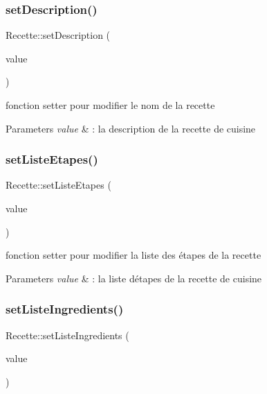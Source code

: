 \subsubsection{\texorpdfstring{set\+Description()}{setDescription()}}
{\footnotesize\ttfamily Recette\+::set\+Description (\begin{DoxyParamCaption}\item[{const Q\+String \&}]{value }\end{DoxyParamCaption})}



fonction setter pour modifier le nom de la recette 


\begin{DoxyParams}{Parameters}
{\em value} & \+: la description de la recette de cuisine \\
\hline
\end{DoxyParams}
\mbox{\label{classRecette_aaf908c155a9b4936b94ca7852232f57d}} 
\subsubsection{\texorpdfstring{set\+Liste\+Etapes()}{setListeEtapes()}}
{\footnotesize\ttfamily Recette\+::set\+Liste\+Etapes (\begin{DoxyParamCaption}\item[{const Q\+String\+List \&}]{value }\end{DoxyParamCaption})}



fonction setter pour modifier la liste des étapes de la recette 


\begin{DoxyParams}{Parameters}
{\em value} & \+: la liste d\textquotesingle{}étapes de la recette de cuisine \\
\hline
\end{DoxyParams}
\mbox{\label{classRecette_a5d50321b71741def086d7897e2dd62f7}} 
\subsubsection{\texorpdfstring{set\+Liste\+Ingredients()}{setListeIngredients()}}
{\footnotesize\ttfamily Recette\+::set\+Liste\+Ingredients (\begin{DoxyParamCaption}\item[{const Q\+String\+List \&}]{value }\end{DoxyParamCaption})}



